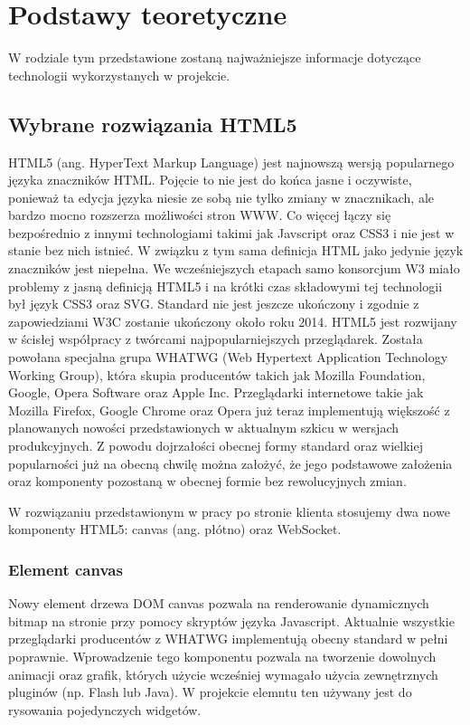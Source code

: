\documentclass[polish]{inz}
\begin{document}
\chapter{Podstawy teoretyczne}
W rodziale tym przedstawione zostaną najważniejsze informacje dotyczące technologii wykorzystanych w projekcie. 

\section{Wybrane rozwiązania HTML5}
HTML5 (ang. HyperText Markup Language) jest najnowszą wersją popularnego języka znaczników HTML. Pojęcie to nie jest do końca jasne i oczywiste, ponieważ ta edycja języka niesie ze sobą nie tylko zmiany w znacznikach, ale bardzo mocno rozszerza możliwości stron WWW. Co więcej łączy się bezpośrednio z innymi technologiami takimi jak Javscript oraz CSS3 i nie jest w stanie bez nich istnieć. W związku z tym sama definicja HTML jako jedynie język znaczników jest niepełna. We wcześniejszych etapach samo konsorcjum W3 miało problemy z jasną definicją HTML5 i na krótki czas składowymi tej technologii był język CSS3 oraz SVG.
Standard nie jest jeszcze ukończony i zgodnie z zapowiedziami W3C zostanie ukończony około roku 2014.
HTML5 jest rozwijany w ścisłej współpracy z twórcami najpopularniejszych przeglądarek. Została powołana specjalna grupa WHATWG (Web Hypertext Application Technology Working Group), która skupia producentów takich jak Mozilla Foundation, Google, Opera Software oraz Apple Inc. Przeglądarki internetowe takie jak Mozilla Firefox, Google Chrome oraz Opera już teraz implementują większość z planowanych nowości przedstawionych w aktualnym szkicu w wersjach produkcyjnych. Z powodu dojrzałości obecnej formy standard oraz wielkiej popularności już na obecną chwilę można założyć, że jego podstawowe założenia oraz komponenty pozostaną w obecnej formie bez rewolucyjnych zmian.

W rozwiązaniu przedstawionym w pracy po stronie klienta stosujemy dwa nowe komponenty HTML5: canvas (ang. płótno) oraz WebSocket.

\subsection{Element canvas}
Nowy element drzewa DOM canvas pozwala na renderowanie dynamicznych bitmap na stronie przy pomocy skryptów języka Javascript. Aktualnie wszystkie przeglądarki producentów z WHATWG implementują obecny standard w pełni poprawnie.
 Wprowadzenie tego komponentu pozwala na tworzenie dowolnych animacji oraz grafik, których użycie wcześniej wymagało użycia zewnętrznych pluginów (np. Flash lub Java).
W projekcie elemntu ten używany jest do rysowania pojedynczych widgetów. 
\end{document}
